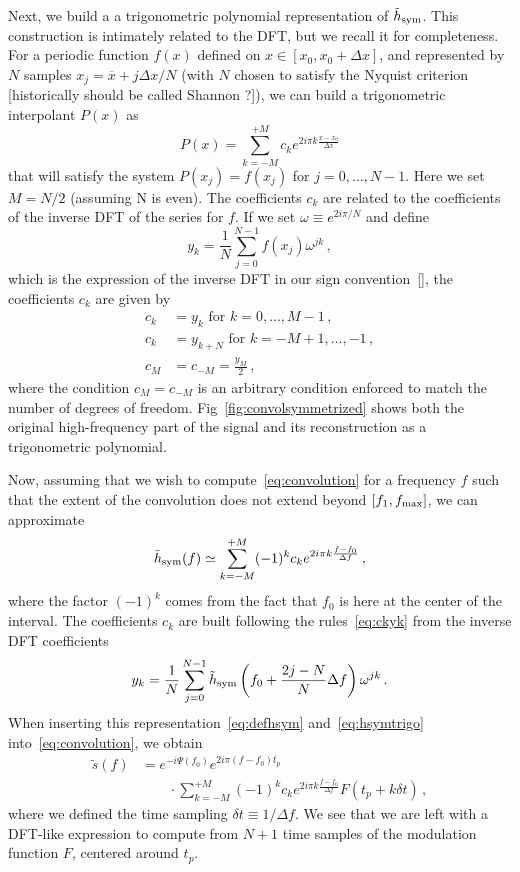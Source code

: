 \documentclass[aps,showpacs,twocolumn,
prd,superscriptaddress,nofootinbib]{revtex4-1}
\newcommand{\be}{\begin{equation}}
\newcommand{\ee}{\end{equation}}
\newcommand{\ov}[1]{\overline{#1}}
\newcommand{\nn}{\nonumber}
\newcommand{\SM}[1]{{\color{Red} #1}}
\begin{document}
Next, we build a a trigonometric polynomial representation of $\tilde{h}_{\rm sym }$. This construction is intimately related to the DFT, but we recall it for completeness. For a periodic function $f(x)$ defined on $x\in [x_{0}, x_{0} + \Delta x]$, and represented by $N$ samples $x_{j} = \ov{x} + j \Delta x/N$ (with $N$ chosen to satisfy the Nyquist criterion \SM{[historically should be called Shannon ?]}), we can build a trigonometric interpolant $P(x)$ as
\be
	P(x) = \sum\limits_{k=-M}^{+M} c_{k} e^{2i\pi k \frac{x-x_{0}}{\Delta x}}
\ee
that will satisfy the system $P(x_{j}) = f(x_{j})$ for $j=0,\dots, N-1$. Here we set $M=N/2$ (assuming N is even). The coefficients $c_{k}$ are related to the coefficients of the inverse DFT of the series for $f$. If we set $\omega \equiv e^{2i\pi/N}$ and define
\be
	y_{k} = \frac{1}{N} \sum\limits_{j=0}^{N-1} f(x_{j}) \omega^{jk} \,,
\ee
which is the expression of the inverse DFT in our sign convention~\eqref{}, the coefficients $c_{k}$ are given by
\begin{align}\label{eq:ckyk}
	c_{k} &= y_{k} \text{ for } k=0,\dots, M-1 \,, \nn\\
	c_{k} &= y_{k+N} \text{ for } k=-M+1,\dots, -1 \,, \nn\\
	c_{M} &= c_{-M} = \frac{y_{M}}{2} \,,
\end{align}
where the condition $c_{M} = c_{-M}$ is an arbitrary condition enforced to match the number of degrees of freedom. Fig~\ref{fig:convolsymmetrized} shows both the original high-frequency part of the signal and its reconstruction as a trigonometric polynomial.

Now, assuming that we wish to compute~\eqref{eq:convolution} for a frequency $f$ such that the extent of the convolution does not extend beyond $[f_{1}, f_{\rm max}]$, we can approximate
\be\label{eq:hsymtrigo}
	\tilde{h}_{\rm sym } (f) \simeq \sum\limits_{k=-M}^{+M} (-1)^{k} c_{k} e^{2i\pi k \frac{f-f_{0}}{\Delta f}} \,,
\ee
where the factor $(-1)^{k}$ comes from the fact that $f_{0}$ is here at the center of the interval. The coefficients $c_{k}$ are built following the rules~\eqref{eq:ckyk} from the inverse DFT coefficients
\be\label{eq:ykDFT}
	y_{k} = \frac{1}{N} \sum\limits_{j=0}^{N-1} \tilde{h}_{\rm sym}\left( f_{0} + \frac{2j - N}{N} \Delta f \right) \omega^{jk} \,.
\ee
When inserting this representation~\eqref{eq:defhsym} and~\eqref{eq:hsymtrigo} into~\eqref{eq:convolution}, we obtain
\begin{align}\label{eq:resultdirectconvol}
	\tilde{s}(f) &= e^{-i \Psi(f_{0})} e^{2i\pi (f-f_{0}) t_{p}} \nn\\
	& \qquad \cdot\sum\limits_{k=-M}^{+M} (-1)^{k} c_{k} e^{2i\pi k \frac{f-f_{0}}{\Delta f}} F(t_{p} + k\delta t) \,, 
\end{align}
where we defined the time sampling $\delta t \equiv 1/\Delta f$. We see that we are left with a DFT-like expression to compute from $N+1$ time samples of the modulation function $F$, centered around $t_{p}$.
\end{document}
